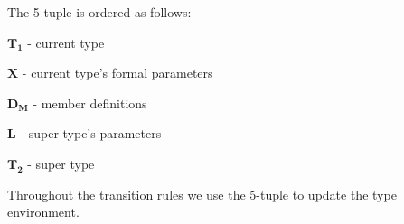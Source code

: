 The 5-tuple is ordered as follows:

\begin{nlist}
  \item $\mathbf{T_{1}}$ - current type
  \item $\mathbf{X}$ - current type's formal parameters
  \item $\mathbf{D_{M}}$ - member definitions
  \item $\mathbf{L}$ - super type's parameters
  \item $\mathbf{T_{2}}$ - super type
\end{nlist}

Throughout the transition rules we use the 5-tuple to update the type environment.


